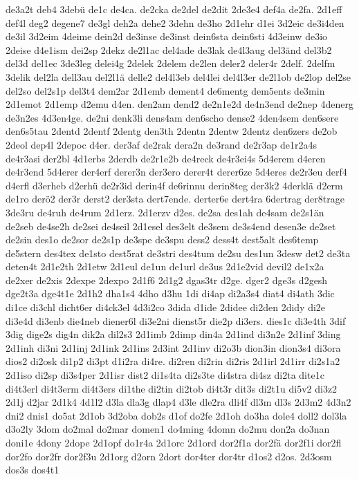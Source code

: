 {de3a2t
deb4
3debü
de1c
de4ca.
de2cka
de2del
de2dit
2de3e4
def4a
de2fa.
2d1eff
def4l
deg2
degene7
de3gl
deh2a
dehe2
3dehn
de3ho
2d1ehr
d1ei
3d2eic
de3i4den
de3il
3d2eim
4deime
dein2d
de3inse
de3inst
dein6sta
dein6sti
4d3einw
de3io
2deise
d4e1ism
dei2sp
2dekz
de2l1ac
del4ade
de3lak
de4l3aug
del3änd
del3b2
del3d
del1ec
3de3leg
delei4g
2delek
2delem
de2len
deler2
deler4r
2delf.
2delfm
3delik
del2la
dell3au
del2l1ä
delle2
del4l3eb
del4lei
del4l3er
de2l1ob
de2lop
del2se
del2so
del2s1p
del3t4
dem2ar
2d1emb
dement4
de6mentg
dem5ents
de3min
2d1emot
2d1emp
d2emu
d4en.
den2am
dend2
de2n1e2d
de4n3end
de2nep
4denerg
de3n2es
4d3en4ge.
de2ni
denk3li
dens4am
den6scho
dense2
4den4sem
den6sere
den6s5tau
2dentd
2dentf
2dentg
den3th
2dentn
2dentw
2dentz
den6zers
de2ob
2deol
dep4l
2depoc
d4er.
der3af
de2rak
dera2n
de3rand
de2r3ap
de1r2a4s
de4r3asi
der2bl
4d1erbs
2derdb
de2r1e2b
de4reck
de4r3ei4s
5d4erem
d4eren
de4r3end
5d4erer
der4erf
derer3n
der3ero
derer4t
derer6ze
5d4eres
de2r3eu
derf4
d4erfl
d3erheb
d2erhü
de2r3id
derin4f
de6rinnu
derin8teg
der3k2
4derklä
d2erm
de1ro
derö2
der3r
derst2
der3sta
dert7ende.
derter6e
dert4ra
6dertrag
der8trage
3de3ru
de4ruh
de4rum
2d1erz.
2d1erzv
d2es.
de2sa
des1ah
de4sam
de2s1än
de2seb
de4se2h
de2sei
de4seil
2d1esel
des3elt
de3sem
de3s4end
desen3e
de2set
de2sin
des1o
de2sor
de2s1p
de3spe
de3spu
dess2
dess4t
dest5alt
des6temp
de5stern
des4tex
de1sto
dest5rat
de3stri
des4tum
de2su
des1un
3desw
det2
de3ta
deten4t
2d1e2th
2d1etw
2d1eul
de1un
de1url
de3us
2d1e2vid
devil2
de1x2a
de2xer
de2xis
2dexpe
2dexpo
2d1f6
2d1g2
dgas3tr
d2ge.
dger2
dge3s
d2gesh
dge2t3a
dge4t1e
2d1h2
dha1s4
4dho
d3hu
1di
di4ap
di2a3s4
diat4
di4ath
3dic
di1ce
di3chl
dicht6er
di4ck3el
4d3i2co
3dida
d1ide
2didee
di2den
2didy
di2e
di3e4d
di3enb
die4neb
diener6l
di3e2ni
dienst5r
die2p
di3ers.
dies1c
di3e4th
3dif
3dig
dige2s
dig4n
dik2a
dil2s3
2d1imb
2dimp
din4a
2d1ind
di3n2e
2d1inf
3ding
2d1inh
di3ni
2d1inj
2d1ink
2d1ins
2d3int
2d1inv
di2o3b
dion3in
dion3s4
di3ora
dios2
di2osk
di1p2
di3pt
d1i2ra
di4re.
di2ren
di2rin
di2ris
2d1irl
2d1irr
di2s1a2
2d1iso
di2sp
di3s4per
2d1isr
dist2
di1s4ta
di2s3te
di4stra
di4sz
di2ta
dite1c
di4t3erl
di4t3erm
di4t3ers
di1the
di2tin
di2tob
di4t3r
dit3s
di2t1u
di5v2
di3z2
2d1j
d2jar
2d1k4
4d1l2
d3la
dla3g
dlap4
d3le
dle2ra
dli4f
dl3m
dl3s
2d3m2
4d3n2
dni2
dnis1
do5at
2d1ob
3d2oba
dob2s
d1of
do2fe
2d1oh
do3ha
dole4
doll2
dol3la
d3o2ly
3dom
do2mal
do2mar
domen1
do4ming
4domn
do2mu
don2a
do3nan
doni1e
4dony
2dope
2d1opf
do1r4a
2d1orc
2d1ord
dor2f1a
dor2fä
dor2f1i
dor2fl
dor2fo
dor2fr
dor2f3u
2d1org
d2orn
2dort
dor4ter
dor4tr
d1os2
d2os.
2d3osm
dos3s
dos4t1
}
